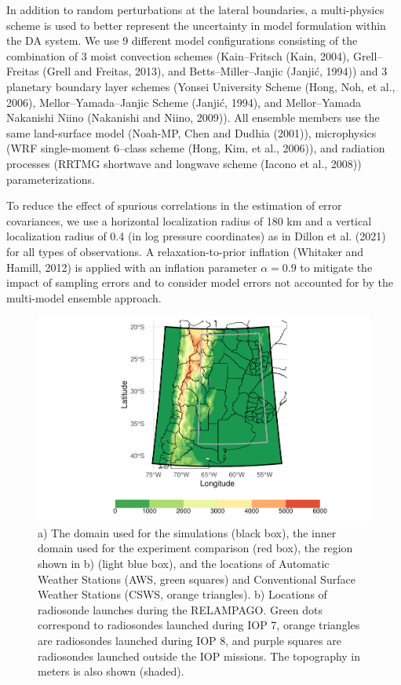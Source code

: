 \documentclass[final,5p,times,twocolumn,authoryear]{elsarticle} %
\begin{document}
In addition to random perturbations at the lateral boundaries, a multi-physics scheme is used to better represent the uncertainty in model formulation within the DA system. We use 9 different model configurations consisting of the combination of 3 moist convection schemes (Kain--Fritsch (Kain, 2004), Grell--Freitas (Grell and Freitas, 2013), and Betts--Miller--Janjic (Janjić, 1994)) and 3 planetary boundary layer schemes (Yonsei University Scheme (Hong, Noh, et al., 2006), Mellor--Yamada--Janjic Scheme (Janjić, 1994), and Mellor--Yamada Nakanishi Niino (Nakanishi and Niino, 2009)). All ensemble members use the same land-surface model (Noah-MP, Chen and Dudhia (2001)), microphysics (WRF single-moment 6--class scheme (Hong, Kim, et al., 2006)), and radiation processes (RRTMG shortwave and longwave scheme (Iacono et al., 2008)) parameterizations.

To reduce the effect of spurious correlations in the estimation of error covariances, we use a horizontal localization radius of 180 km and a vertical localization radius of 0.4 (in log pressure coordinates) as in Dillon et al. (2021) for all types of observations.
A relaxation-to-prior inflation (Whitaker and Hamill, 2012) is applied with an inflation parameter \(\alpha=0.9\) to mitigate the impact of sampling errors and to consider model errors not accounted for by the multi-model ensemble approach.



\begin{figure}
\includegraphics[width=1\linewidth]{../figures/dominio-1} \caption{a) The domain used for the simulations (black box), the inner domain used for the experiment comparison (red box), the region shown in b) (light blue box), and the locations of Automatic Weather Stations (AWS, green squares) and Conventional Surface Weather Stations (CSWS, orange triangles). b) Locations of radiosonde launches during the RELAMPAGO. Green dots correspond to radiosondes launched during IOP 7, orange triangles are radiosondes launched during IOP 8, and purple squares are radiosondes launched outside the IOP missions. The topography in meters is also shown (shaded).}\label{fig:dominio}
\end{figure}
\end{document}
